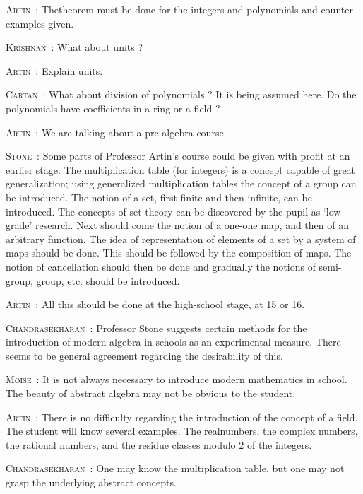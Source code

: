 \smallskip
\noindent
\textsc{Artin}~: The\pageoriginale theorem must be done for the integers and polynomials and counter examples given.

\smallskip
\noindent
\textsc{Krishnan}~: What about units ?

\smallskip
\noindent
\textsc{Artin}~: Explain units.

\smallskip
\noindent
\textsc{Cartan}~: What about division of polynomials ? It is being assumed here. Do the polynomials have coefficients in a ring or a field ?

\smallskip
\noindent
\textsc{Artin}~: We are talking about a pre-algebra course.

\smallskip
\noindent
\textsc{Stone}~: Some parts of Professor Artin's course could be given with profit at an earlier stage. The multiplication table (for integers) is a concept capable of great generalization; using generalized multiplication tables the concept of a group can be introduced. The notion of a set, first finite and then infinite, can be introduced. The concepts of set-theory can be discovered by the pupil as `low-grade' research. Next should come the notion of a one-one map, and then of an arbitrary function. The idea of representation of elements of a set by a system of maps should be done. This should be followed by the composition of maps. The notion of cancellation should then be done and gradually the notions of semi-group, group, etc. should be introduced.

\smallskip
\noindent
\textsc{Artin}~: All this should be done at the high-school stage, at 15 or 16.

\smallskip
\noindent
\textsc{Chandrasekharan}~: Professor Stone suggests certain methods for the introduction of modern algebra in schools as an experimental measure. There seems to be general agreement regarding the desirability of this.

\smallskip
\noindent
\textsc{Moise}~: It is not always necessary to introduce modern mathematics in school. The beauty of abstract algebra may not be obvious to the student.

\smallskip
\noindent
\textsc{Artin}~: There is no difficulty regarding the introduction of the concept of a field. The student will know several examples. The real\pageoriginale numbers, the complex numbers, the rational numbers, and the residue classes modulo 2 of the integers.

\smallskip
\noindent
\textsc{Chandrasekharan}~: One may know the multiplication table, but one may not grasp the underlying abstract concepts.

